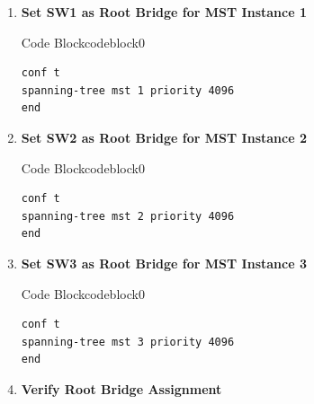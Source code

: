 \documentclass[a4paper]{book}
\begin{document}
\begin{enumerate}
	\item \textbf{Set SW1 as Root Bridge for MST Instance 1}
	



\begin{ocg}{Code Block}{codeblock}{0}
    \vspace{0.5cm}
    \begin{lstlisting}
conf t
spanning-tree mst 1 priority 4096
end
\end{lstlisting}
\end{ocg}


	\item \textbf{Set SW2 as Root Bridge for MST Instance 2}
	


\begin{ocg}{Code Block}{codeblock}{0}
    \vspace{0.5cm}
    \begin{lstlisting}
conf t
spanning-tree mst 2 priority 4096
end
\end{lstlisting}
\end{ocg}


	
	\item \textbf{Set SW3 as Root Bridge for MST Instance 3}
	


\begin{ocg}{Code Block}{codeblock}{0}
    \vspace{0.5cm}
    \begin{lstlisting}
conf t
spanning-tree mst 3 priority 4096
end
\end{lstlisting}
\end{ocg}


	\item \textbf{Verify Root Bridge Assignment}
    



\end{enumerate}
\end{document}
